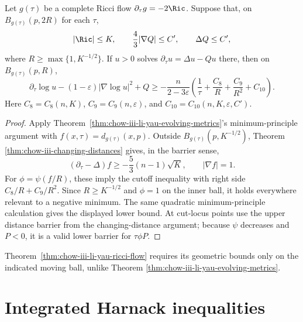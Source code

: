 \begin{theorem}
\label{thm:chow-iii-li-yau-ricci-flow}
Let \(g(\tau)\) be a complete Ricci flow
\(\partial_\tau g=-2\Ric\).  Suppose that, on
\(B_{g(\tau)}(p,2R)\) for each \(\tau\),
\[
 |\Ric|\leq K,\qquad \frac43|\nabla Q|\leq C',
 \qquad\Delta Q\leq C',
\]
where \(R\geq\max\{1,K^{-1/2}\}\).  If \(u>0\) solves
\(\partial_\tau u=\Delta u-Qu\) there, then on
\(B_{g(\tau)}(p,R)\),
\[
 \partial_\tau\log u-(1-\varepsilon)|\nabla\log u|^2+Q
 \geq-\frac{n}{2-3\varepsilon}
 \left(\frac1\tau+\frac{C_8}{R}+\frac{C_9}{R^2}+C_{10}\right).
\]
Here \(C_8=C_8(n,K)\), \(C_9=C_9(n,\varepsilon)\), and
\(C_{10}=C_{10}(n,K,\varepsilon,C')\).
\end{theorem}
\begin{proof}
\sketch Apply Theorem~\ref{thm:chow-iii-li-yau-evolving-metrics}'s
minimum-principle argument with \(f(x,\tau)=d_{g(\tau)}(x,p)\).  Outside
\(B_{g(\tau)}(p,K^{-1/2})\), Theorem
\ref{thm:chow-iii-changing-distances} gives, in the barrier sense,
\[
 (\partial_\tau-\Delta)f\geq-\frac53(n-1)\sqrt K,
 \qquad |\nabla f|=1.
\]
For \(\phi=\psi(f/R)\), these imply the cutoff inequality with right side
\(C_8/R+C_9/R^2\).  Since \(R\geq K^{-1/2}\) and \(\phi=1\) on the inner
ball, it holds everywhere relevant to a negative minimum.  The same
quadratic minimum-principle calculation gives the displayed lower bound.
At cut-locus points use the upper distance barrier from the changing-distance
argument; because \(\psi\) decreases and \(P<0\), it is a valid lower barrier
for \(\tau\phi P\).
\end{proof}

\begin{remark}
\label{rem:chow-iii-li-yau-locality-ricci-flow}
Theorem~\ref{thm:chow-iii-li-yau-ricci-flow} requires its geometric bounds
only on the indicated moving ball, unlike Theorem
\ref{thm:chow-iii-li-yau-evolving-metrics}.
\end{remark}

\section{Integrated Harnack inequalities}

